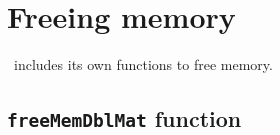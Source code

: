 \section{Freeing memory} \label{sec:freeingMemory}

\BI\ includes its own functions to free memory.

\subsection{\texttt{freeMemDblMat} function} \label{sec:freeMemDblMat}


